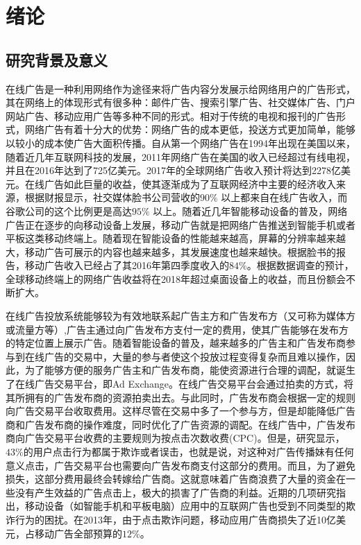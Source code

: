 \chapter{绪论}
\label{chap:intro}
\section{研究背景及意义}
在线广告是一种利用网络作为途径来将广告内容分发展示给网络用户的广告形式，其在网络上的体现形式有很多种：邮件广告、搜索引擎广告、社交媒体广告、门户网站广告、移动应用广告等多种不同的形式。相对于传统的电视和报刊的广告形式，网络广告有着十分大的优势：网络广告的成本更低，投送方式更加简单，能够以较小的成本使广告大面积传播。自从第一个网络广告在1994年出现在美国以来，随着近几年互联网科技的发展，2011年网络广告在美国的收入已经超过有线电视\cite{Iab2012}，并且在2016年达到了725亿美元\cite{Iab2016}。2017年的全球网络广告收入预计将达到2278亿美元。在线广告如此巨量的收益，使其逐渐成为了互联网经济中主要的经济收入来源，根据财报显示，社交媒体脸书公司营收的$90\%$ 以上都来自在线广告收入，而谷歌公司的这个比例更是高达$95\%$ 以上。随着近几年智能移动设备的普及，网络广告正在逐步的向移动设备上发展，移动广告就是把网络广告推送到智能手机或者平板这类移动终端上。随着现在智能设备的性能越来越高，屏幕的分辨率越来越大，移动广告可展示的内容也越来越多，其发展速度也越来越快。根据脸书的报告，移动广告收入已经占了其2016年第四季度收入的$84\%$。根据数据调查的预计，全球移动终端上的网络广告收益将在2018年超过桌面设备上的收益，而且份额会不断扩大。

在线广告投放系统能够较为有效地联系起广告主方和广告发布方（又可称为媒体方或流量方等）,广告主通过向广告发布方支付一定的费用，使其广告能够在发布方的特定位置上展示广告。随着智能设备的普及，越来越多的广告主和广告发布商参与到在线广告的交易中，大量的参与者使这个投放过程变得复杂而且难以操作，因此，为了能够方便的服务广告主和广告发布商，能使资源进行合理的调配，就诞生了在线广告交易平台，即Ad Exchange。在线广告交易平台会通过拍卖的方式，将其所拥有的广告发布商的资源拍卖出去。与此同时，广告发布商会根据一定的规则向广告交易平台收取费用。这样尽管在交易中多了一个参与方，但是却能降低广告商和广告发布商的操作难度，同时优化了广告资源的调配。在线广告中，广告发布商向广告交易平台收费的主要规则为按点击次数收费(CPC)。但是，研究显示，$43\%$的用户点击行为都属于欺诈或者误击\cite{truth}，也就是说，对这种对广告传播妹有任何意义点击，广告交易平台也需要向广告发布商支付这部分的费用。而且，为了避免损失，这部分费用最终会转嫁给广告商。这就意味着广告商浪费了大量的资金在一些没有产生效益的广告点击上，极大的损害了广告商的利益。近期的几项研究指出，移动设备（如智能手机和平板电脑）应用中的互联网广告也受到不同类型的欺诈行为的困扰。在2013年，由于点击欺诈问题，移动应用广告商损失了近10亿美元，占移动广告全部预算的$12\%$\cite{Bots}。

